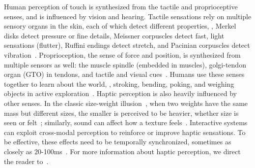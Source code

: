 Human perception of touch is synthesized from the tactile and proprioceptive senses, and is influenced by vision and hearing.
Tactile sensations rely on multiple sensory organs in the skin, each of which detect different properties, \eg, Merkel disks detect pressure or fine details, Meissner corpuscles detect fast, light sensations (flutter), Ruffini endings detect stretch, and Pacinian corpuscles detect vibration~\citep{ChoiKuchenbecker2013}.
Proprioception, the sense of force and position, is synthesized from multiple sensors as well: the muscle spindle (embedded in muscles), golgi-tendon organ (GTO) in tendons, and tactile and visual cues~\citep{Kandel2000}.
Humans use these senses together to learn about the world, \eg, stroking, bending, poking, and weighing objects in active exploration~\citep{Lederman1987}.
Haptic perception is also heavily influenced by other senses.
In the classic size-weight illusion~\citep{charpentier1891analyse}, when two weights have the same mass but different sizes, the smaller is perceived to be heavier, whether size is seen or felt~\citep{Hayward2016}; similarly, sound can affect how a texture feels~\citep{Hayward2016}.
Interactive systems can exploit cross-modal perception to reinforce or improve haptic sensations. To be effective, these effects need to be temporally synchronized, sometimes as closely as
20-100ms~\citep{Kaaresoja2014}.
For more information about haptic perception, we direct the reader to~\citep{Lederman2009survey,Kandel2000,ChoiKuchenbecker2013}.



